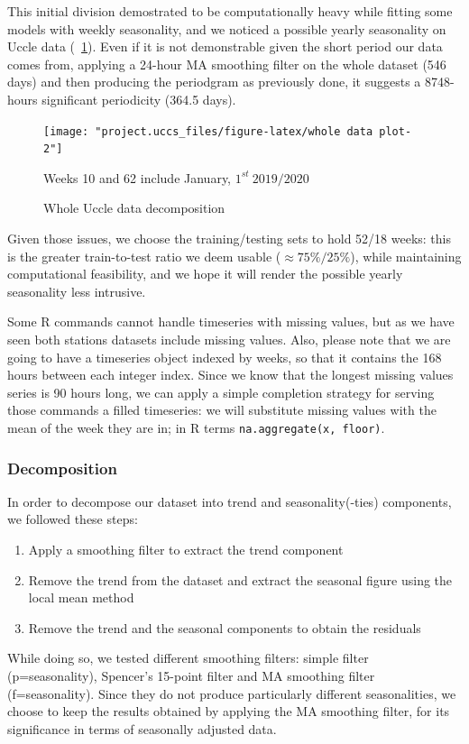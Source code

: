 \documentclass[12pt]{article}
\begin{document}
This initial division demostrated to be computationally heavy while fitting some models with weekly seasonality, and we noticed a possible yearly seasonality on Uccle data (\figurename~\ref{fig:whole-data-decomposition}). Even if it is not demonstrable given the short period our data comes from, applying a 24-hour MA smoothing filter on the whole dataset (546 days) and then producing the periodgram as previously done, it suggests a 8748-hours significant periodicity (364.5 days).

\begin{figure}[h]
	\centering
	\texttt{[image: "project.uccs\_files/figure-latex/whole data plot-2"]}
	\caption{Whole Uccle data decomposition}{\footnotesize Weeks 10 and 62 include January, $1^{st}~2019/2020$}
	\label{fig:whole-data-decomposition}
\end{figure}

Given those issues, we choose the training/testing sets to hold 52/18 weeks: this is the greater train-to-test ratio we deem usable ($\approx 75\%/25\%$), while maintaining computational feasibility, and we hope it will render the possible yearly seasonality less intrusive.


Some R commands cannot handle timeseries with missing values, but as we have seen both stations datasets include missing values.
Also, please note that we are going to have a timeseries object indexed by weeks, so that it contains the 168 hours between each integer index.
Since we know that the longest missing values series is 90 hours long, we can apply a simple completion strategy for serving those commands a filled timeseries: we will substitute missing values with the mean of the week they are in; in R terms \texttt{na.aggregate(x, floor)}.


\subsubsection{Decomposition}
In order to decompose our dataset into trend and seasonality(-ties) components, we followed these steps:
\begin{enumerate}[topsep=0.5em,itemsep=0em,partopsep=0.5em]
	\item Apply a smoothing filter to extract the trend component
	\item Remove the trend from the dataset and extract the seasonal figure using the local mean method
	\item Remove the trend and the seasonal components to obtain the residuals
\end{enumerate}
While doing so, we tested different smoothing filters: simple filter (p=seasonality), Spencer's 15-point filter and MA smoothing filter (f=seasonality). Since they do not produce particularly different seasonalities, we choose to keep the results obtained by applying the MA smoothing filter, for its significance in terms of seasonally adjusted data.
\end{document}
